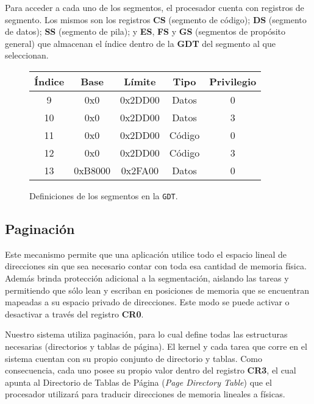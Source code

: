 \documentclass[a4paper]{article}
\begin{document}
Para acceder a cada uno de los segmentos, el procesador cuenta con registros de segmento. Los mismos son los registros \textbf{CS} (segmento de código); \textbf{DS} (segmento de datos); \textbf{SS} (segmento de pila); y \textbf{ES}, \textbf{FS} y \textbf{GS} (segmentos de propósito general) que almacenan el índice dentro de la \textbf{GDT} del segmento al que seleccionan.

\begin{figure}
	\begin{center}
	\begin{tabular}{|c|c|c|c|c|}
	\hline
  	Índice	&	Base 	&	Límite				&	Tipo	&	Privilegio 	\\ \hline
  	9 		&	0x0		&	0x2DD00	&	Datos	&	0			\\ \hline
  	10 		&	0x0		&	0x2DD00	&	Datos	&	3			\\ \hline
  	11 		&	0x0		&	0x2DD00	&	Código	&	0			\\ \hline
  	12 		&	0x0		&	0x2DD00 &	Código	&	3			\\ \hline
  	13		&	0xB8000	&	0x2FA00		&	Datos	& 	0			\\ 
  	\hline
  	
	\end{tabular}
	\end{center}
	\caption{Definiciones de los segmentos en la \texttt{GDT}.}
	\label{Segs}
\end{figure}


\subsection{Paginación}
Este mecanismo permite que una aplicación utilice todo el espacio lineal de direcciones sin que sea necesario contar con toda esa cantidad de memoria física. Además brinda protección adicional a la segmentación, aislando las tareas y permitiendo que sólo lean y escriban en posiciones de memoria que se encuentran mapeadas a su espacio privado de direcciones. Este modo se puede activar o desactivar a través del registro \textbf{CR0}.

Nuestro sistema utiliza paginación, para lo cual define todas las estructuras necesarias (directorios y tablas de página). El kernel y cada tarea que corre en el sistema cuentan con su propio conjunto de directorio y tablas. Como consecuencia, cada uno posee su propio valor dentro del registro \textbf{CR3}, el cual apunta al Directorio de Tablas de Página (\textit{Page Directory Table}) que el procesador utilizará para traducir direcciones de memoria lineales a físicas.
\end{document}
